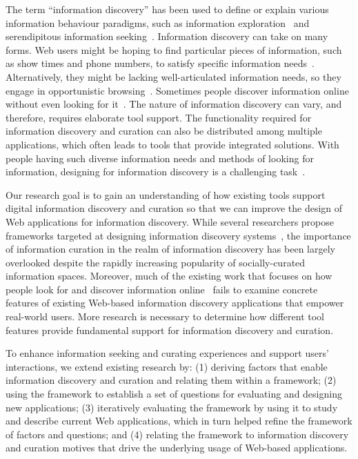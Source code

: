 \documentclass{sigchi}
\begin{document}
The term ``information discovery'' has been used to define or explain various information behaviour paradigms, such as information exploration~\cite{waterworth1991model} and serendipitous information seeking~\cite{foster2003serendipity}.  
Information discovery can take on many forms. Web users might be hoping to find particular pieces of information, such as show times and phone numbers, to satisfy specific information needs~\cite{proper1999information}. Alternatively, they might be lacking well-articulated information needs, so they engage in opportunistic browsing~\cite{lindley2012s}. Sometimes people discover information online without even looking for it~\cite{bates1986exploratory}. The nature of information discovery can vary, and therefore, requires elaborate tool support. The functionality required for information discovery and curation can also be distributed among multiple applications, which often leads to tools that provide integrated solutions. With people having such diverse information needs and methods of looking for information, designing for information discovery is a challenging task~\cite{conaway2010designing, marchionini2006exploratory}.

Our research goal is to gain an understanding of how existing tools support digital information discovery and curation so that we can improve the design of Web applications for information discovery. While several researchers propose frameworks targeted at designing information discovery systems~\cite{proper1999information, kerne2004information}, the importance of information curation in the realm of information discovery has been largely overlooked despite the rapidly increasing popularity of socially-curated information spaces. Moreover, much of the existing work that focuses on how people look for and discover information online~\cite{bates1986exploratory, choo2000information, ellis1989behavioural, kellar2006goal, lindley2012s, morrison2001taxonomic, sellen2002knowledge} fails to examine concrete features of existing Web-based information discovery applications that empower real-world users. More research is necessary to determine how different tool features provide fundamental support for information discovery and curation.

To enhance information seeking and curating experiences and support users' interactions, we extend existing research by: (1) deriving factors that enable information discovery and curation and relating them within a framework; (2) using the framework to establish a set of questions for evaluating and designing new applications; (3) iteratively evaluating the framework by using it to study and describe current Web applications, which in turn helped refine the framework of factors and questions; and (4) relating the framework to information discovery and curation motives that drive the underlying usage of Web-based applications.
\end{document}
